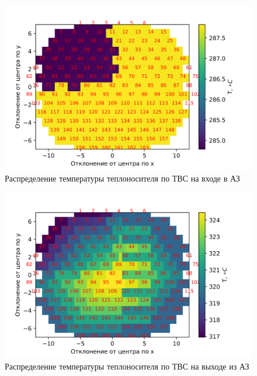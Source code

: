 \begin{figure}[H]
	\begin{center}
		\includegraphics{treton_one_gcn_t_all_cells_z_is_0.png}
		\caption{Распределение температуры теплоносителя по ТВС на входе в АЗ}
		\label{pic:treton-one-gcn-t-all-cells-z-is-0} %
	\end{center}
\end{figure}

\begin{figure}[H]
	\begin{center}
		\includegraphics{treton_one_gcn_t_all_cells_z_is_29.png}
		\caption{Распределение температуры теплоносителя по ТВС на выходе из АЗ}
		\label{pic:treton-one-gcn-t-all-cells-z-is-29}
	\end{center}
\end{figure}

